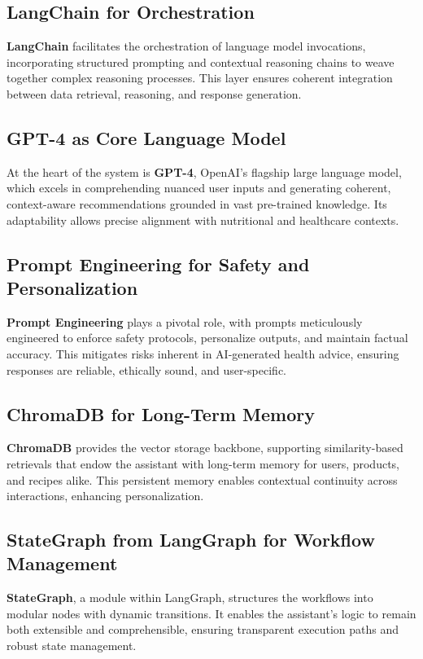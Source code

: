 \subsection{LangChain for Orchestration}
\textbf{LangChain} facilitates the orchestration of language model invocations, incorporating structured prompting and contextual reasoning chains to weave together complex reasoning processes. This layer ensures coherent integration between data retrieval, reasoning, and response generation.

\subsection{GPT-4 as Core Language Model}
At the heart of the system is \textbf{GPT-4}, OpenAI's flagship large language model, which excels in comprehending nuanced user inputs and generating coherent, context-aware recommendations grounded in vast pre-trained knowledge. Its adaptability allows precise alignment with nutritional and healthcare contexts.

\subsection{Prompt Engineering for Safety and Personalization}
\textbf{Prompt Engineering} plays a pivotal role, with prompts meticulously engineered to enforce safety protocols, personalize outputs, and maintain factual accuracy. This mitigates risks inherent in AI-generated health advice, ensuring responses are reliable, ethically sound, and user-specific.

\subsection{ChromaDB for Long-Term Memory}
\textbf{ChromaDB} provides the vector storage backbone, supporting similarity-based retrievals that endow the assistant with long-term memory for users, products, and recipes alike. This persistent memory enables contextual continuity across interactions, enhancing personalization.

\subsection{StateGraph from LangGraph for Workflow Management}
\textbf{StateGraph}, a module within LangGraph, structures the workflows into modular nodes with dynamic transitions. It enables the assistant’s logic to remain both extensible and comprehensible, ensuring transparent execution paths and robust state management.

